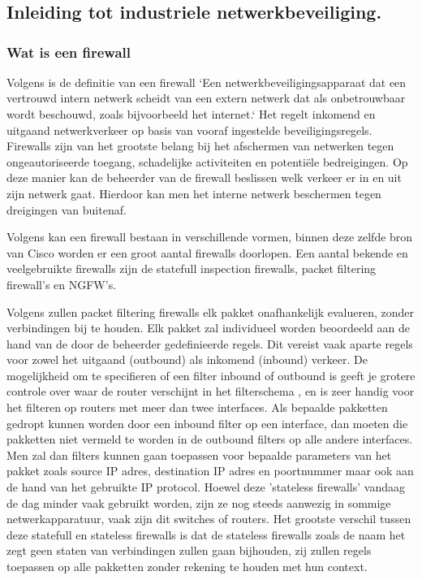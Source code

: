 \chapter{}%
\label{ch:stand-van-zaken}

\section{Inleiding tot industriele netwerkbeveiliging.}

\subsection{Wat is een firewall}
Volgens \textcite{ciscoFW2025} is de definitie van een firewall `Een netwerkbeveiligingsapparaat dat een vertrouwd intern netwerk scheidt van een extern netwerk dat als onbetrouwbaar wordt beschouwd, zoals bijvoorbeeld het internet.` Het regelt inkomend en uitgaand netwerkverkeer op basis van vooraf ingestelde beveiligingsregels. Firewalls zijn van het grootste belang bij het afschermen van netwerken tegen ongeautoriseerde toegang, schadelijke activiteiten en potentiële bedreigingen.
Op deze manier kan de beheerder van de firewall beslissen welk verkeer er in en uit zijn netwerk gaat. Hierdoor kan men het interne netwerk beschermen tegen dreigingen van buitenaf.

\vspace{5mm}
Volgens \textcite{ciscoFW2025} kan een firewall bestaan in verschillende vormen, binnen deze zelfde bron van Cisco worden er een groot aantal firewalls doorlopen. Een aantal bekende en veelgebruikte firewalls zijn de statefull inspection firewalls, packet filtering firewall's  en NGFW's.
 
 \vspace{5mm}
Volgens \textcite{goel2014} zullen packet filtering firewalls elk pakket onafhankelijk evalueren, zonder verbindingen bij te houden. Elk pakket zal individueel worden beoordeeld aan de hand van de door de beheerder gedefinieerde regels. Dit vereist vaak aparte regels voor zowel het uitgaand (outbound) als inkomend (inbound) verkeer. De mogelijkheid om te specifieren of een filter inbound of outbound is geeft je grotere controle over waar de router verschijnt in het filterschema , en is zeer handig voor het filteren op routers met meer dan twee interfaces. Als bepaalde pakketten gedropt kunnen worden door een inbound filter op een interface, dan moeten die pakketten niet vermeld te worden in de outbound filters op alle andere interfaces. Men zal dan filters kunnen gaan toepassen voor bepaalde parameters van het pakket zoals source IP adres, destination IP adres en poortnummer maar ook aan de hand van het gebruikte IP protocol. Hoewel deze 'stateless firewalls' vandaag de dag minder vaak gebruikt worden, zijn ze nog steeds aanwezig in sommige netwerkapparatuur, vaak zijn dit switches of routers. Het grootste verschil tussen deze statefull en stateless firewalls is dat de stateless firewalls zoals de naam het zegt geen staten van verbindingen zullen gaan bijhouden, zij zullen regels toepassen op alle pakketten zonder rekening te houden met hun context. \autocite{goel2014}

